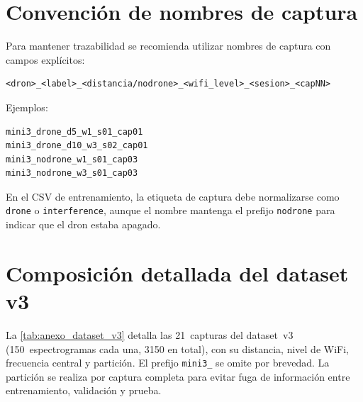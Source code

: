 \section{Convención de nombres de captura}
\label{anexo:nombres}

Para mantener trazabilidad se recomienda utilizar nombres de captura con campos explícitos:

\begin{lstlisting}[caption={Formato recomendado de nombre de captura.}]
<dron>_<label>_<distancia/nodrone>_<wifi_level>_<sesion>_<capNN>
\end{lstlisting}

Ejemplos:

\begin{lstlisting}[caption={Ejemplos de nombres de captura.}]
mini3_drone_d5_w1_s01_cap01
mini3_drone_d10_w3_s02_cap01
mini3_nodrone_w1_s01_cap03
mini3_nodrone_w3_s01_cap03
\end{lstlisting}

En el CSV de entrenamiento, la etiqueta de captura debe normalizarse como \texttt{drone} o \texttt{interference}, aunque el nombre mantenga el prefijo \texttt{nodrone} para indicar que el dron estaba apagado.

\section{Composición detallada del dataset v3}
\label{anexo:dataset_v3}

La \cref{tab:anexo_dataset_v3} detalla las \num{21}~capturas del dataset~v3 (\num{150}~espectrogramas cada una, \num{3150} en total), con su distancia, nivel de WiFi, frecuencia central y partición. El prefijo \texttt{mini3\_} se omite por brevedad. La partición se realiza por captura completa para evitar fuga de información entre entrenamiento, validación y prueba.

